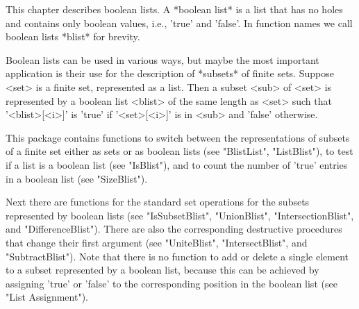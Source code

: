 
This chapter describes boolean lists.   A *boolean list*  is a list  that
has no holes and contains only boolean values, i.e., 'true'  and 'false'.
In function names we call boolean lists *blist* for brevity.

Boolean lists can be used  in various ways, but  maybe the most important
application is their use for the description of *subsets* of finite sets.
Suppose <set>  is a finite set,  represented  as  a list.   Then a subset
<sub>  of <set> is represented  by a boolean  list   <blist>  of the same
length as <set> such that '<blist>[<i>]' is 'true'  if '<set>[<i>]' is in
<sub> and 'false' otherwise.

This package contains functions to  switch between the representations of
subsets of  a   finite set either  as  sets  or as   boolean  lists  (see
"BlistList",  "ListBlist"),  to test  if  a  list is a  boolean list (see
"IsBlist"), and to count the number of  'true' entries in  a boolean list
(see "SizeBlist").

Next there are functions for the standard set  operations for the subsets
represented  by    boolean  lists   (see  "IsSubsetBlist",  "UnionBlist",
"IntersectionBlist",   and   "DifferenceBlist").   There  are    also the
corresponding destructive procedures  that  change their  first  argument
(see  "UniteBlist", "IntersectBlist",  and  "SubtractBlist").  Note  that
there is no   function to add or   delete a single  element   to a subset
represented by a boolean list, because this  can be achieved by assigning
'true' or 'false' to the corresponding  position in the boolean list (see
"List Assignment").

